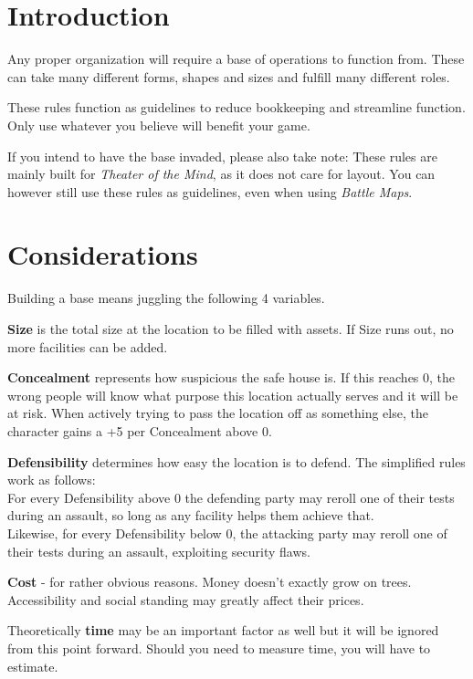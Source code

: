 \documentclass[12pt,a4paper,openany,usenames,dvipsnames]{book}
\begin{document}
	

	\chapter{Introduction}
	Any proper organization will require a base of operations to function from. These can take many different forms, shapes and sizes and fulfill many different roles.
	\par
	These rules function as guidelines to reduce bookkeeping and streamline function. Only use whatever you believe will benefit your game.
	\par
	If you intend to have the base invaded, please also take note: These rules are mainly built for \emph{Theater of the Mind}, as it does not care for layout. You can however still use these rules as guidelines, even when using \emph{Battle Maps}.

	\chapter{Considerations}
	\vspace*{-10mm}
	Building a base means juggling the following 4 variables.\par
	\textbf{Size} is the total size at the location to be filled with assets. If Size runs out, no more facilities can be added.\par
	\textbf{Concealment} represents how suspicious the safe house is. If this reaches 0, the wrong people will know what purpose this location actually serves and it will be at risk.
	When actively trying to pass the location off as something else, the character gains a +5 per Concealment above 0.\par
	\textbf{Defensibility} determines how easy the location is to defend. The simplified rules work as follows:\\
	For every Defensibility above 0 the defending party may reroll one of their tests during an assault, so long as any facility helps them achieve that.\\
	Likewise, for every Defensibility below 0, the attacking party may reroll one of their tests during an assault, exploiting security flaws.\par
	\textbf{Cost} - for rather obvious reasons. Money doesn't exactly grow on trees. Accessibility and social standing may greatly affect their prices.\par
	Theoretically \textbf{time} may be an important factor as well but it will be ignored from this point forward. Should you need to measure time, you will have to estimate.
\end{document}
